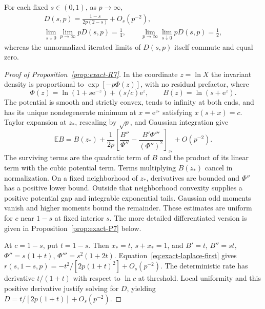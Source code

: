 \begin{proposition}\label{prop:exact-R7}
For each fixed $s \in (0,1)$, as $p \to \infty$,
\begin{equation}
\begin{gathered}
D(s,p) = \frac{1-s}{2p(2-s)} + O_s(p^{-2}),\\
\lim_{s\downarrow 0}\lim_{p\to\infty} p D(s,p) = \frac{1}{4}, \qquad
\lim_{p\to\infty}\lim_{s\downarrow 0} p D(s,p) = \frac{1}{2},
\end{gathered}
\label{eq:exact-noncommute}
\end{equation}
whereas the unnormalized iterated limits of $D(s,p)$ itself commute and equal zero.
\end{proposition}

\begin{proof}[Proof of Proposition~\ref{prop:exact-R7}]
In the coordinate $z=\ln X$ the invariant density is proportional to $\exp[-p\Phi(z)]$, with no residual prefactor, where
\begin{equation}
 \Phi(z)=\ln(1+s\mathrm{e}^{-z})+(s/c)\mathrm{e}^z,
 \qquad B(z)=\ln(s+\mathrm{e}^z).
 \label{eq:exact-laplace-potential}
\end{equation}
The potential is smooth and strictly convex, tends to infinity at both ends, and has its unique nondegenerate minimum at $x=\mathrm{e}^{z_*}$ satisfying $x(s+x)=c$. Taylor expansion at $z_*$, rescaling by $\sqrt p$, and Gaussian integration give
\begin{equation}
 \mathbb EB=B(z_*)+\frac1{2p}
 \left[\frac{B''}{\Phi''}-\frac{B'\Phi'''}{(\Phi'')^2}\right]_{z_*}
 +O(p^{-2}).\label{eq:exact-laplace-first}
\end{equation}
The surviving terms are the quadratic term of $B$ and the product of its linear term with the cubic potential term. Terms multiplying $B(z_*)$ cancel in normalization. On a fixed neighborhood of $z_*$, derivatives are bounded and $\Phi''$ has a positive lower bound. Outside that neighborhood convexity supplies a positive potential gap and integrable exponential tails. Gaussian odd moments vanish and higher moments bound the remainder. These estimates are uniform for $c$ near $1-s$ at fixed interior $s$. The more detailed differentiated version is given in Proposition~\ref{prop:exact-P7} below.

At $c=1-s$, put $t=1-s$. Then $x_*=t$, $s+x_*=1$, and $B'=t$, $B''=st$, $\Phi''=s(1+t)$, $\Phi'''=s^2(1+2t)$. Equation~\eqref{eq:exact-laplace-first} gives $r(s,1-s,p)=-t^2/[2p(1+t)^2]+O_s(p^{-2})$. The deterministic rate has derivative $t/(1+t)$ with respect to $\ln c$ at threshold. Local uniformity and this positive derivative justify solving for $D$, yielding $D=t/[2p(1+t)]+O_s(p^{-2})$.


\end{proof}
